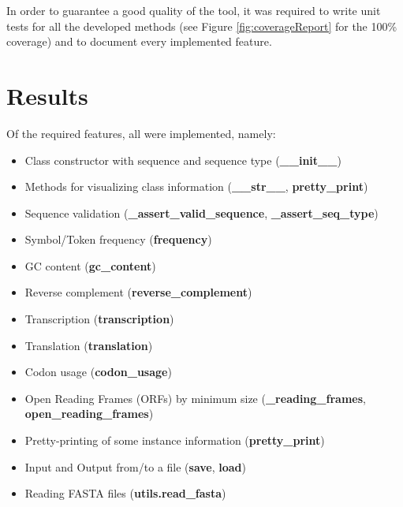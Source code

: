 \documentclass[11pt]{article}
\begin{document}
In order to guarantee a good quality of the tool, it was required to write unit tests for all the developed methods (see Figure \ref{fig:coverageReport} for the 100\% coverage) and to document every implemented feature. 


\section{Results}
Of the required features, all were implemented, namely:
\begin{itemize}
    \itemsep0em 
    \item Class constructor with sequence and sequence type (\textbf{\_\_init\_\_})
    \item Methods for visualizing class information (\textbf{\_\_str\_\_}, \textbf{pretty\_print})
    \item Sequence validation (\textbf{\_assert\_valid\_sequence}, \textbf{\_assert\_seq\_type})
    \item Symbol/Token frequency (\textbf{frequency})
    \item GC content (\textbf{gc\_content})
    \item Reverse complement (\textbf{reverse\_complement})
    \item Transcription (\textbf{transcription})
    \item Translation (\textbf{translation})
    \item Codon usage (\textbf{codon\_usage})
    \item Open Reading Frames (ORFs) by minimum size (\textbf{\_reading\_frames}, \textbf{open\_reading\_frames})
    \item Pretty-printing of some instance information (\textbf{pretty\_print})
    \item Input and Output from/to a file (\textbf{save}, \textbf{load})
    \item Reading FASTA files (\textbf{utils.read\_fasta})
\end{itemize}
\end{document}
